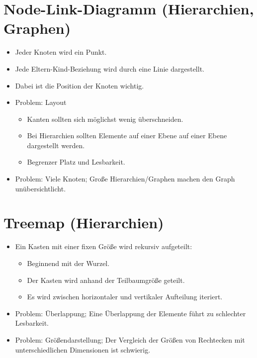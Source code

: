 	\section{Node-Link-Diagramm (Hierarchien, Graphen)}
		\begin{itemize}
			\item Jeder Knoten wird ein Punkt.
			\item Jede Eltern-Kind-Beziehung wird durch eine Linie dargestellt.
			\item Dabei ist die Position der Knoten wichtig.
			\item Problem: Layout
				\begin{itemize}
					\item Kanten sollten sich möglichst wenig überschneiden.
					\item Bei Hierarchien sollten Elemente auf einer Ebene auf einer Ebene dargestellt werden.
					\item Begrenzer Platz und Lesbarkeit.
				\end{itemize}
			\item Problem: Viele Knoten; Große Hierarchien/Graphen machen den Graph unübersichtlicht.
		\end{itemize}

	\section{Treemap (Hierarchien)}
		\begin{itemize}
			\item Ein Kasten mit einer fixen Größe wird rekursiv aufgeteilt:
				\begin{itemize}
					\item Beginnend mit der Wurzel.
					\item Der Kasten wird anhand der Teilbaumgröße geteilt.
					\item Es wird zwischen horizontaler und vertikaler Aufteilung iteriert.
				\end{itemize}
			\item Problem: Überlappung; Eine Überlappung der Elemente führt zu schlechter Lesbarkeit.
			\item Problem: Größendarstellung; Der Vergleich der Größen von Rechtecken mit unterschiedlichen Dimensionen ist schwierig.
		\end{itemize}

